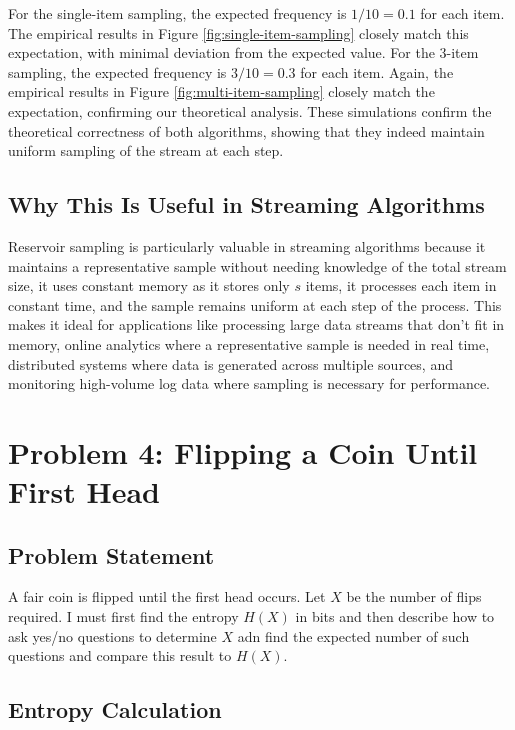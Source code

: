 \documentclass{article}
\begin{document}
For the single-item sampling, the expected frequency is $1/10 = 0.1$ for each item. The empirical results in Figure \ref{fig:single-item-sampling} closely match this expectation, with minimal deviation from the expected value. For the 3-item sampling, the expected frequency is $3/10 = 0.3$ for each item. Again, the empirical results in Figure \ref{fig:multi-item-sampling} closely match the expectation, confirming our theoretical analysis. These simulations confirm the theoretical correctness of both algorithms, showing that they indeed maintain uniform sampling of the stream at each step.

\subsection{Why This Is Useful in Streaming Algorithms}

Reservoir sampling is particularly valuable in streaming algorithms because it maintains a representative sample without needing knowledge of the total stream size, it uses constant memory as it stores only $s$ items, it processes each item in constant time, and the sample remains uniform at each step of the process. This makes it ideal for applications like processing large data streams that don't fit in memory, online analytics where a representative sample is needed in real time, distributed systems where data is generated across multiple sources, and monitoring high-volume log data where sampling is necessary for performance.

\section{Problem 4: Flipping a Coin Until First Head}

\subsection{Problem Statement}
A fair coin is flipped until the first head occurs. Let $X$ be the number of flips required. I must first find the entropy $H(X)$ in bits and then describe how to ask yes/no questions to determine $X$ adn find the expected number of such questions and compare this result to $H(X)$.

\subsection{Entropy Calculation}
\end{document}
